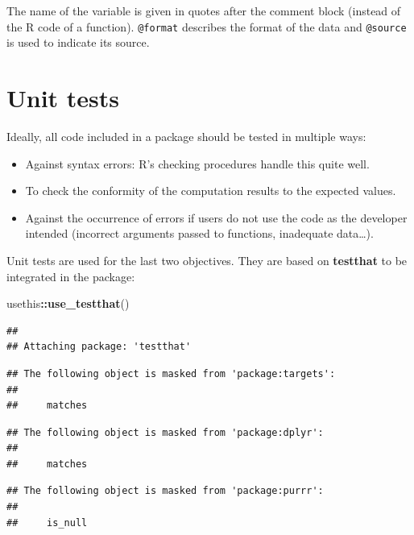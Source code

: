\documentclass[
  12pt,
  american,
  a4paper,
  extrafontsizes,onecolumn,openright
  ]{memoir}
\newenvironment{Shaded}{\begin{snugshade}}{\end{snugshade}}
\newcommand{\FunctionTok}[1]{\textcolor[rgb]{0.13,0.29,0.53}{\textbf{#1}}}
\newcommand{\NormalTok}[1]{#1}
\newcommand{\SpecialCharTok}[1]{\textcolor[rgb]{0.81,0.36,0.00}{\textbf{#1}}}
\providecommand{\tightlist}{%
  \setlength{\itemsep}{0pt}\setlength{\parskip}{0pt}}
\begin{document}
\normalsize

The name of the variable is given in quotes after the comment block (instead of the R code of a function).
\texttt{@format} describes the format of the data and \texttt{@source} is used to indicate its source.

\section{Unit tests}\label{unit-tests}

Ideally, all code included in a package should be tested in multiple ways:

\begin{itemize}
\tightlist
\item
  Against syntax errors: R's checking procedures handle this quite well.
\item
  To check the conformity of the computation results to the expected values.
\item
  Against the occurrence of errors if users do not use the code as the developer intended (incorrect arguments passed to functions, inadequate data\ldots).
\end{itemize}

Unit tests are used for the last two objectives.
They are based on \textbf{testthat} to be integrated in the package:

\scriptsize

\begin{Shaded}
\begin{Highlighting}[]
\NormalTok{usethis}\SpecialCharTok{::}\FunctionTok{use\_testthat}\NormalTok{()}
\end{Highlighting}
\end{Shaded}

\normalsize

\scriptsize

\begin{verbatim}
## 
## Attaching package: 'testthat'
\end{verbatim}

\begin{verbatim}
## The following object is masked from 'package:targets':
## 
##     matches
\end{verbatim}

\begin{verbatim}
## The following object is masked from 'package:dplyr':
## 
##     matches
\end{verbatim}

\begin{verbatim}
## The following object is masked from 'package:purrr':
## 
##     is_null
\end{verbatim}
\end{document}
